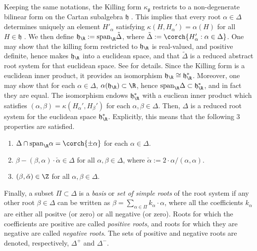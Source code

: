 Keeping the same notations, the Killing form \(\kappa_{\mathfrak{g}}\) restricts to a non-degenerate bilinear form on the Cartan subalgebra \(\mathfrak{h}\) \parencite[Prop. 6.3.2]{hilgert2011structure}. This implies that every root \(\alpha\in \Delta\) determines uniquely an element \(H'_\alpha\) satisfying \(\kappa(H, H_\alpha')=\alpha(H)\) for all \(H \in \mathfrak{h}\) \parencite[Th. 6.3.4]{hilgert2011structure}. We then define \(\mathfrak{h}_\R:=\mathrm{span}_\R\tilde{\Delta}\), where \(\tilde{\Delta}:=\corch{H_\alpha':  \alpha \in \Delta}\). One may show that the killing form restricted to \(\mathfrak{h}_\R\) is real-valued, and positive definite, hence makes \(\mathfrak{h}_\R\) into a euclidean space, and that \(\tilde{\Delta}\) is a reduced abstract root system for that euclidean space. See \parencite[Ch. 6]{hilgert2011structure} for details. Since the Killing form is a euclidean inner product, it provides an isomorphism \(\mathfrak{h}_\R \cong \mathfrak{h}_\R^*\). Moreover, one may show that for each \(\alpha \in \Delta\), \(\alpha(\mathfrak{h}_\R)\subset \R\), hence \(\mathrm{span}_\R \Delta \subset \mathfrak{h}_\R^*\), and in fact they are equal. The isomorphism endows \(\mathfrak{h}_\R^*\) with a eucliean inner product which satisfies \((\alpha, \beta)=\kappa(H_\alpha', H_\beta')\) for each \(\alpha, \beta \in \Delta\). Then, \(\Delta\) is a reduced root system for the euclidean space \(\mathfrak{h}_\R^*\). Explicitly, this means that the following 3 properties are satisfied.
\begin{enumerate}
    \item \(\Delta \cap \mathrm{span}_\R \alpha = \corch{\pm \alpha}\) for each \(\alpha \in \Delta\).
    \item \(\beta- (\beta, \alpha)\cdot \check{\alpha}\in \Delta\) for all \(\alpha, \beta \in \Delta\), where \(\check{\alpha}:=2\cdot \alpha/(\alpha, \alpha)\).
    \item \((\beta, \check{\alpha}) \in \Z\) for all \(\alpha, \beta \in \Delta\).
\end{enumerate}

Finally, a subset \(\Pi \subset \Delta\) is a \textit{basis} or \textit{set of simple roots} of the root system if any other root \(\beta\in \Delta\) can be written as \(\beta=\sum_{\alpha \in \Pi}k_\alpha \cdot \alpha\), where all the coefficients \(k_\alpha\) are either all positve (or zero) or all negative (or zero). Roots for which the coefficients are positive are called \textit{positive roots}, and roots for which they are negative are called \textit{negative roots}. The sets of positive and negative roots are denoted, respectively, \(\Delta^+\) and \(\Delta^-\).


